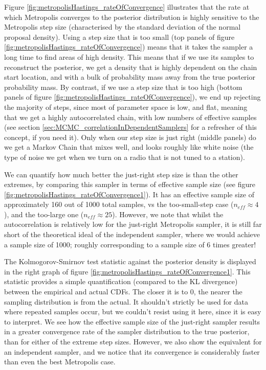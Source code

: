 \documentclass[11pt,fullpage]{book}
\begin{document}
Figure \ref{fig:metropolisHastings_rateOfConvergence} illustrates that the rate at which Metropolis converges to the posterior distribution is highly sensitive to the Metropolis step size (characterised by the standard deviation of the normal proposal density). Using a step size that is too small (top panels of figure \ref{fig:metropolisHastings_rateOfConvergence}) means that it takes the sampler a long time to find areas of high density. This means that if we use its samples to reconstruct the posterior, we get a density that is highly dependent on the chain start location, and with a bulk of probability mass away from the true posterior probability mass. By contrast, if we use a step size that is too high (bottom panels of figure \ref{fig:metropolisHastings_rateOfConvergence}), we end up rejecting the majority of steps, since most of parameter space is low, and flat, meaning that we get a highly autocorrelated chain, with low numbers of effective samples (see section \ref{sec:MCMC_correlationInDependentSamplers} for a refresher of this concept, if you need it). Only when our step size is just right (middle panels) do we get a Markov Chain that mixes well, and looks roughly like white noise (the type of noise we get when we turn on a radio that is not tuned to a station). 

We can quantify how much better the just-right step size is than the other extremes, by comparing this sampler in terms of effective sample size (see figure \ref{fig:metropolisHastings_rateOfConvergence1}). It has an effective sample size of approximately 160 out of 1000 total samples, vs the too-small-step case ($n_{eff}\approx 4$), and the too-large one ($n_{eff}\approx 25$). However, we note that whilst the autocorrelation is relatively low for the just-right Metropolis sampler, it is still far short of the theoretical ideal of the independent sampler, where we would achieve a sample size of 1000; roughly corresponding to a sample size of 6 times greater!

The Kolmogorov-Smirnov test statistic against the posterior density is displayed in the right graph of figure \ref{fig:metropolisHastings_rateOfConvergence1}. This statistic provides a simple quantification (compared to the KL divergence) between the empirical and actual CDFs. The closer it is to 0, the nearer the sampling distribution is from the actual. It shouldn't strictly be used for data where repeated samples occur, but we couldn't resist using it here, since it is easy to interpret. We see how the effective sample size of the just-right sampler results in a greater convergence rate of the sampler distribution to the true posterior, than for either of the extreme step sizes. However, we also show the equivalent for an independent sampler, and we notice that its convergence is considerably faster than even the best Metropolis case.
\end{document}
